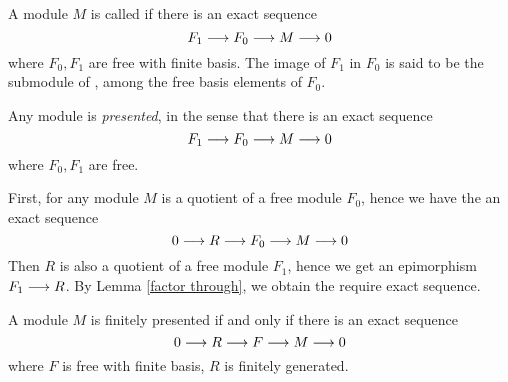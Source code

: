   \begin{defn}
    A module $M$ is called  if there is an exact sequence
    \begin{equation*}
      F_1\longrightarrow F_0\longrightarrow M\longrightarrow 0
    \end{equation*}
    where $F_0,F_1$ are free with finite basis. The image of $F_1$ in $F_0$ is said to be the submodule of , among the free basis elements of $F_0$.
  \end{defn}
  \begin{rem}
    Any module is \emph{presented}, in the sense that there is an exact sequence
    \begin{equation*}
      F_1\longrightarrow F_0\longrightarrow M\longrightarrow 0
    \end{equation*}
    where $F_0,F_1$ are free.

    First, for any module $M$ is a quotient of a free module $F_0$, hence we have the an exact sequence
    \begin{equation*}
      0\longrightarrow R\longrightarrow F_0\longrightarrow M\longrightarrow 0
    \end{equation*}
    Then $R$ is also a quotient of a free module $F_1$, hence we get an epimorphism $F_1\longrightarrow R$.
    By Lemma \ref{factor through}, we obtain the require exact sequence.
  \end{rem}

  \begin{prop}
    A module $M$ is finitely presented if and only if there is an exact sequence
    \begin{equation*}
      0\longrightarrow R\longrightarrow F\longrightarrow M\longrightarrow 0
    \end{equation*}
    where $F$ is free with finite basis, $R$ is finitely generated.
  \end{prop}

